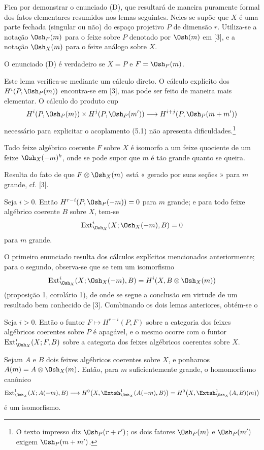 Fica por demonstrar o enunciado (D), que resultará de maneira puramente formal dos fatos
elementares resumidos nos lemas seguintes. Neles se supõe que $X$ é uma
parte fechada (singular ou não) do espaço projetivo $P$ de dimensão $r$.
Utiliza-se a notação $\Osh_P(m)$ para o feixe sobre $P$ denotado por $\Osh(m)$ em
[3], e a notação $\Osh_X(m)$ para o feixe análogo sobre $X$.

 O enunciado (D) é verdadeiro se $X=P$ e $F=\Osh_P(m)$.

Este lema verifica-se mediante um cálculo direto. O cálculo explícito dos
$H^{i}(P,\Osh_P(m))$ encontra-se em [3], mas pode ser feito de maneira mais
elementar. O cálculo do produto cup
\[
  H^{i}(P,\Osh_P(m))\times H^{j}(P,\Osh_P(m'))
  \longrightarrow H^{i+j}(P,\Osh_P(m+m'))
\]
necessário para explicitar o acoplamento (5.1) não apresenta
dificuldades.\footnote{O texto impresso diz $\Osh_P(r+r')$; os dois fatores
$\Osh_P(m)$ e $\Osh_P(m')$ exigem $\Osh_P(m+m')$.}

 Todo feixe algébrico coerente $F$ sobre $X$ é isomorfo a
um feixe quociente de um feixe $\Osh_X(-m)^{k}$, onde se pode supor que $m$ é
tão grande quanto se queira.

Resulta do fato de que $F\otimes\Osh_X(m)$ está « gerado por suas seções » para
$m$ grande, cf. [3].

 Seja $i>0$. Então
$H^{r-i}(P,\Osh_P(-m))=0$ para $m$ grande; e para todo feixe algébrico
coerente $B$ sobre $X$, tem-se
\[
  \operatorname{Ext}_{\Osh_X}^{i}(X;\Osh_X(-m),B)=0
\]
para $m$ grande.

O primeiro enunciado resulta dos cálculos explícitos mencionados anteriormente; para o
segundo, observa-se que se tem um isomorfismo
\[
  \operatorname{Ext}_{\Osh_X}^{i}(X;\Osh_X(-m),B)
  =H^{i}(X,B\otimes\Osh_X(m))
\]
(proposição 1, corolário 1), de onde se segue a conclusão em virtude de um resultado bem
conhecido de [3]. Combinando os dois lemas anteriores, obtém-se o

 Seja $i>0$. Então o funtor
$F\longmapsto H^{r-i}(P,F)$ sobre a categoria dos feixes algébricos coerentes
sobre $P$ é apagável, e o mesmo ocorre com o funtor
$\operatorname{Ext}_{\Osh_X}^{i}(X;F,B)$ sobre a categoria dos feixes
algébricos coerentes sobre $X$.

 Sejam $A$ e $B$ dois feixes algébricos coerentes sobre
$X$, e ponhamos $A(m)=A\otimes\Osh_X(m)$. Então, para $m$ suficientemente grande,
o homomorfismo canônico
\[
  \operatorname{Ext}_{\Osh_X}^{1}(X;A(-m),B)
  \longrightarrow H^{0}\bigl(X,\Extsh_{\Osh_X}^{1}(A(-m),B)\bigr)
  =H^{0}\bigl(X,\Extsh_{\Osh_X}^{1}(A,B)(m)\bigr)
\]
é um isomorfismo.

